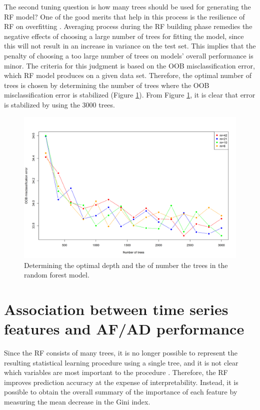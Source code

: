 \documentclass[preprint, 3p,
authoryear]{elsarticle} %
\begin{document}
The second tuning question is how many trees should be used for
generating the RF model? One of the good merits that help in this
process is the resilience of RF on overfitting
\citep{friedman2001elements}. Averaging process during the RF building
phase remedies the negative effects of choosing a large number of trees
for fitting the model, since this will not result in an increase in
variance on the test set. This implies that the penalty of choosing a
too large number of trees on models' overall performance is minor. The
criteria for this judgment is based on the OOB misclassification error,
which RF model produces on a given data set. Therefore, the optimal
number of trees is chosen by determining the number of trees where the
OOB misclassification error is stabilized (Figure \ref{fig:tree_depth}).
From Figure \ref{fig:tree_depth}, it is clear that error is stabilized
by using the 3000 trees.

\begin{figure}[H]

{\centering \includegraphics[width=0.9\linewidth]{img/Fig_tree_depth_and_ntrees} 

}

\caption{Determining the optimal depth and the of number the trees in the random forest model.}\label{fig:tree_depth}
\end{figure}

\hypertarget{res}{%
\section{Association between time series features and AF/AD
performance}\label{res}}

Since the RF consists of many trees, it is no longer possible to
represent the resulting statistical learning procedure using a single
tree, and it is not clear which variables are most important to the
procedure \citep{james2013introduction}. Therefore, the RF improves
prediction accuracy at the expense of interpretability. Instead, it is
possible to obtain the overall summary of the importance of each feature
by measuring the mean decrease in the Gini index.
\end{document}
